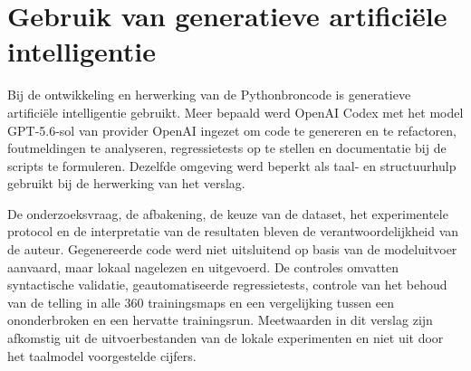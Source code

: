 \section{Gebruik van generatieve artificiële intelligentie}

Bij de ontwikkeling en herwerking van de Pythonbroncode is generatieve artificiële intelligentie gebruikt. Meer bepaald werd OpenAI Codex met het model \mbox{GPT-5.6-sol} van provider OpenAI ingezet om code te genereren en te refactoren, foutmeldingen te analyseren, regressietests op te stellen en documentatie bij de scripts te formuleren. Dezelfde omgeving werd beperkt als taal- en structuurhulp gebruikt bij de herwerking van het verslag.

De onderzoeksvraag, de afbakening, de keuze van de dataset, het experimentele protocol en de interpretatie van de resultaten bleven de verantwoordelijkheid van de auteur. Gegenereerde code werd niet uitsluitend op basis van de modeluitvoer aanvaard, maar lokaal nagelezen en uitgevoerd. De controles omvatten syntactische validatie, geautomatiseerde regressietests, controle van het behoud van de telling in alle 360 trainingsmaps en een vergelijking tussen een ononderbroken en een hervatte trainingsrun. Meetwaarden in dit verslag zijn afkomstig uit de uitvoerbestanden van de lokale experimenten en niet uit door het taalmodel voorgestelde cijfers.
